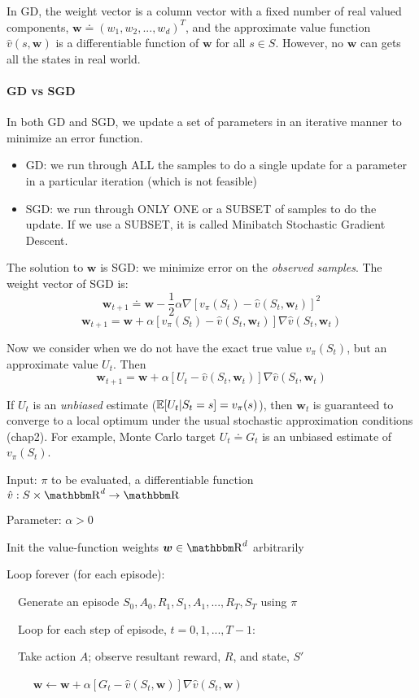 \documentclass[sutton_barto_notes.tex]{subfiles}
\begin{document}
In GD, the weight vector is a column vector with a fixed number of real valued components, $\bm{w} \doteq (w_1, w_2, ..., w_d)^T $, and the approximate value function $\hat{v}(s,\bm{w})$ is a differentiable function of $\bm{w}$ for all $s \in S$. However, no $\bm{w}$ can gets all the states in real world.

\paragraph{GD vs SGD} In both GD and SGD, we update a set of parameters in an iterative manner to minimize an error function.
\begin{itemize}
\item GD: we run through ALL the samples to do a single update for a parameter in a particular iteration (which is not feasible)
\item SGD: we run through ONLY ONE or a SUBSET of samples to do the update. If we use a SUBSET, it is called Minibatch Stochastic Gradient Descent.
\end{itemize}

The solution to $\bm{w}$ is SGD: we minimize error on the \textit{observed samples}. The weight vector of SGD is:
$$ \bm{w}_{t+1} \doteq \bm{w} - \frac{1}{2}\alpha \nabla [v_\pi(S_t) - \hat{v}(S_t, \bm{w}_t)]^2$$
$$ \bm{w}_{t+1} = \bm{w} + \alpha[v_\pi(S_t) - \hat{v}(S_t, \bm{w}_t)]\nabla \hat{v}(S_t, \bm{w}_t) $$

Now we consider when we do not have the exact true value $v_\pi(S_t)$, but an approximate value $U_t$. Then
$$ \bm{w}_{t+1} = \bm{w} + \alpha[U_t - \hat{v}(S_t, \bm{w}_t)]\nabla \hat{v}(S_t, \bm{w}_t) $$

If $U_t$ is an \textit{unbiased} estimate ($\operatorname*{\mathbb{E}}[U_t|S_t=s]=v_\pi(s)$), then $\bm{w}_t$ is guaranteed to converge to a local optimum under the usual stochastic approximation conditions (chap2). For example, Monte Carlo target $U_t\doteq G_t$ is an unbiased estimate of $v_\pi(S_t)$.

\begin{tcolorbox}[width=1.1\textwidth,title={Gradient Monte Carlo for Estimating $\hat{v}\approx v_\pi$}]
Input: $\pi$ to be evaluated, a differentiable function $\hat{v}:S\times\R^d \rightarrow \R$

Parameter: $\alpha > 0$

Init the value-function weights $\bm{w} \in \R^d$ arbitrarily

Loop forever (for each episode):

$\quad$Generate an episode $S_0, A_0, R_1, S_1, A_1, ..., R_T, S_T$ using $\pi$

$\quad$Loop for each step of episode, $t = 0,1,...,T-1$:

$\quad$Take action $A$; observe resultant reward, $R$, and state, $S'$

$\quad\quad$ $\bm{w} \leftarrow \bm{w} + \alpha [ G_t - \hat{v}(S_t, \bm{w})]\nabla \hat{v}(S_t, \bm{w})$
\end{tcolorbox}
\end{document}
